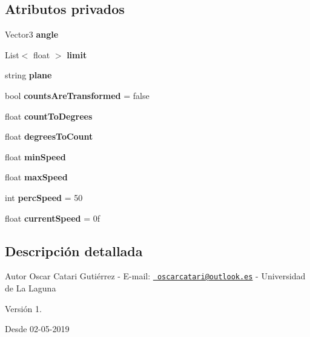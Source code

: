 \subsection*{Atributos privados}
\begin{DoxyCompactItemize}
\item 
\mbox{\label{class_articulation_abd23ea47f7f82fc1137a2a67511ca9bb}} 
Vector3 {\bfseries angle}
\item 
\mbox{\label{class_articulation_abbe4425e0bfa1964ced48a025a50d326}} 
List$<$ float $>$ {\bfseries limit}
\item 
\mbox{\label{class_articulation_a87fba785eed8db50cb379536ce7ef168}} 
string {\bfseries plane}
\item 
\mbox{\label{class_articulation_a1dc922cba9a344d7769cf60a33733c79}} 
bool {\bfseries counts\+Are\+Transformed} = false
\item 
\mbox{\label{class_articulation_a6364c5edba29a5b74a587be7f0b6e320}} 
float {\bfseries count\+To\+Degrees}
\item 
\mbox{\label{class_articulation_ad2cbeae71ddd9f987dae8f6ece7d0b78}} 
float {\bfseries degrees\+To\+Count}
\item 
\mbox{\label{class_articulation_a9f180a4dd504e1e824b0260195540569}} 
float {\bfseries min\+Speed}
\item 
\mbox{\label{class_articulation_a64600f7d0fb637860d01de29536ebe20}} 
float {\bfseries max\+Speed}
\item 
\mbox{\label{class_articulation_abb6ffedc22b45cd27a59c23124227b0e}} 
int {\bfseries perc\+Speed} = 50
\item 
\mbox{\label{class_articulation_a1522e4342b1ac429b245e84d805d34d8}} 
float {\bfseries current\+Speed} = 0f
\end{DoxyCompactItemize}


\subsection{Descripción detallada}
\begin{DoxyAuthor}{Autor}
Oscar Catari Gutiérrez -\/ E-\/mail\+: \href{mailto:oscarcatari@outlook.es}{\texttt{ oscarcatari@outlook.\+es}} -\/ Universidad de La Laguna 
\end{DoxyAuthor}
\begin{DoxyVersion}{Versión}
1. 
\end{DoxyVersion}
\begin{DoxySince}{Desde}
02-\/05-\/2019 
\end{DoxySince}


